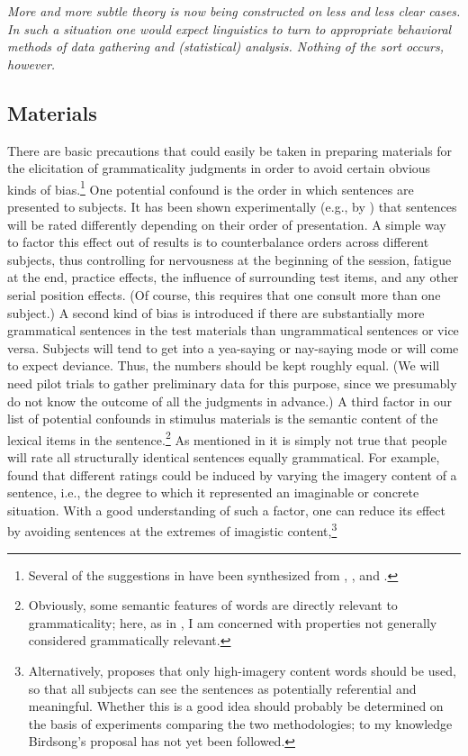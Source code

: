  \epigraph{\itshape More and more subtle theory is now being constructed on less and less clear cases. In such a situation one would expect linguistics to turn to appropriate behavioral methods of data gathering  and (statistical) analysis. Nothing of the sort occurs, however.\\[-2\baselineskip]}{\citep{LeveltEtAl1977}}


 \subsection{Materials} \label{sec:6.3.1}

 There are basic precautions that could easily be taken in preparing materials for the elicitation of grammaticality judgments in order to avoid certain obvious kinds of bias.\footnote{Several of the suggestions in  have been synthesized from \citet{Birdsong1989}, \citet{RayEtAl1988}, and \citet{Snow1975}.}
  One potential confound is the order in which sentences are presented to subjects. It has been shown experimentally (e.g., by \citet{Greenbaum1973}) that sentences will be rated differently depending on their order of presentation. A simple way to factor this effect out of results is to counterbalance orders across different subjects, thus controlling for nervousness at the beginning of the session, fatigue at the end, practice effects, the influence of surrounding test items, and any other serial position effects. (Of course, this requires that one consult more than one subject.) A second kind of bias is introduced if there are substantially more grammatical sentences in the test materials than ungrammatical sentences or vice versa. Subjects will tend to get into a yea-saying or nay-saying mode or will come to expect deviance. Thus, the numbers should be kept roughly equal. (We will need pilot trials to gather preliminary data for this purpose, since we presumably do not know the outcome of all the judgments in advance.) A third factor in our list of potential confounds in stimulus materials is the semantic content of the lexical items in the sentence.\footnote{Obviously, some semantic features of words are directly relevant to grammaticality; here, as in , I am concerned with properties not generally considered grammatically relevant.}
  As mentioned in  it is simply not true that people will rate all structurally identical sentences equally grammatical. For example, \citet{LeveltEtAl1977} found that different ratings could be induced by varying the imagery content of a sentence, i.e., the degree to which it represented an imaginable or concrete situation. With a good understanding of such a factor, one can reduce its effect by avoiding sentences at the extremes of imagistic content,\footnote{Alternatively, \citet{Birdsong1989} proposes that only high-imagery content words should be used, so that all subjects can see the sentences as potentially referential and meaningful. Whether this is a good idea should probably be determined on the basis of experiments comparing the two methodologies; to my knowledge Birdsong's proposal has not yet been followed.}
